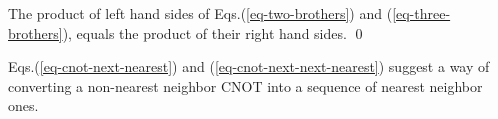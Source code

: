 \claim

\proof
The product of left hand sides
of Eqs.(\ref{eq-two-brothers})
and (\ref{eq-three-brothers}),
equals the product of their
right hand sides.
\qed

Eqs.(\ref{eq-cnot-next-nearest}) and
(\ref{eq-cnot-next-next-nearest})
suggest a way of converting a
non-nearest neighbor CNOT
into a sequence
of nearest neighbor ones.
